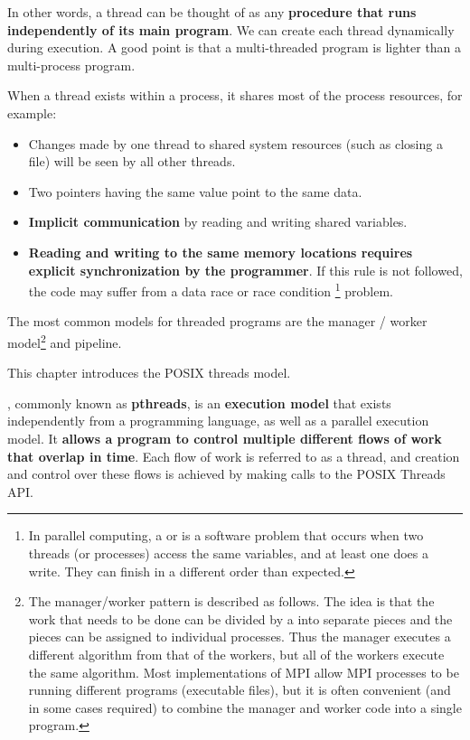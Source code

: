 \noindent
In other words, a thread can be thought of as any \textbf{procedure that runs independently of its main program}. We can create each thread dynamically during execution. A good point is that a multi-threaded program is lighter than a multi-process program.

\newpage
\noindent
When a thread exists within a process, it shares most of the process resources, for example:
\begin{itemize}
    \item Changes made by one thread to shared system resources (such as closing a file) will be seen by all other threads.
    \item Two pointers having the same value point to the same data.
    \item \textbf{Implicit communication} by reading and writing shared variables.
    \item \textbf{Reading and writing to the same memory locations requires explicit synchronization by the programmer}. If this rule is not followed, the code may suffer from a data race or race condition \footnote{In parallel computing, a  or \label{def: race condition} is a software problem that occurs when two threads (or processes) access the same variables, and at least one does a write. They can finish in a different order than expected.} problem.
\end{itemize}
The most common models for threaded programs are the manager / worker model\footnote{The manager/worker pattern is described as follows. The idea is that the work that needs to be done can be divided by a  into separate pieces and the pieces can be assigned to individual  processes. Thus the manager executes a different algorithm from that of the workers, but all of the workers execute the same algorithm. Most implementations of MPI allow MPI processes to be running different programs (executable files), but it is often convenient (and in some cases required) to combine the manager and worker code into a single program.} and pipeline.

\highspace
This chapter introduces the POSIX threads model.
\begin{definitionbox}[: pthreads]
    , commonly known as \textbf{pthreads}, is an \textbf{execution model} that exists independently from a programming language, as well as a parallel execution model. It \textbf{allows a program to control multiple different flows of work that overlap in time}. Each flow of work is referred to as a thread, and creation and control over these flows is achieved by making calls to the POSIX Threads API.
\end{definitionbox}

